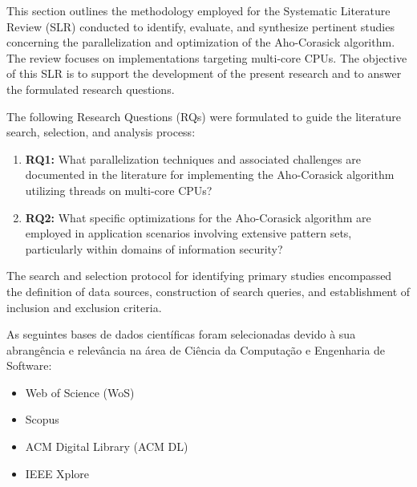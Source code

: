 
This section outlines the methodology employed for the Systematic Literature Review (SLR) conducted to identify, evaluate, and synthesize pertinent studies concerning the parallelization and optimization of the Aho-Corasick algorithm. The review focuses on implementations targeting multi-core CPUs. The objective of this SLR is to support the development of the present research and to answer the formulated research questions.


The following Research Questions (RQs) were formulated to guide the literature search, selection, and analysis process:
\begin{enumerate}
    \item \textbf{RQ1:} What parallelization techniques and associated challenges are documented in the literature for implementing the Aho-Corasick algorithm utilizing threads on multi-core CPUs?
    \item \textbf{RQ2:} What specific optimizations for the Aho-Corasick algorithm are employed in application scenarios involving extensive pattern sets, particularly within domains of information security?
\end{enumerate}


The search and selection protocol for identifying primary studies encompassed the definition of data sources, construction of search queries, and establishment of inclusion and exclusion criteria.

As seguintes bases de dados científicas foram selecionadas devido à sua abrangência e relevância na área de Ciência da Computação e Engenharia de Software:
\begin{itemize}
    \item Web of Science (WoS)
    \item Scopus
    \item ACM Digital Library (ACM DL)
    \item IEEE Xplore
\end{itemize}


